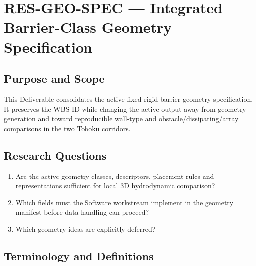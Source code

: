 
\section{RES-GEO-SPEC --- Integrated Barrier-Class Geometry Specification}
\label{sec:res-geo-spec}

\subsection{Purpose and Scope}
\label{sec:res-geo-spec-purpose}

This Deliverable consolidates the active fixed-rigid barrier geometry
specification. It preserves the WBS ID while changing the active output
away from geometry generation and toward reproducible wall-type and
obstacle/dissipating/array comparisons in the two Tohoku corridors.

\subsection{Research Questions}
\label{sec:res-geo-spec-research-questions}

\begin{enumerate}
  \item Are the active geometry classes, descriptors, placement rules
    and representations sufficient for local 3D hydrodynamic
    comparison?
  \item Which fields must the Software workstream implement in the
    geometry manifest before data handling can proceed?
  \item Which geometry ideas are explicitly deferred?
\end{enumerate}

\subsection{Terminology and Definitions}
\label{sec:res-geo-spec-definitions}

